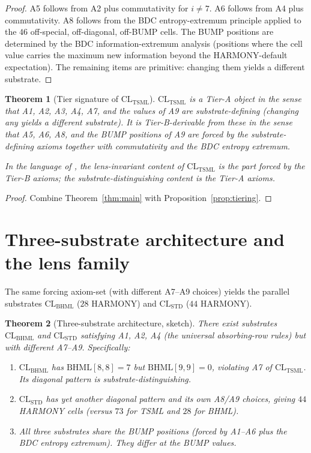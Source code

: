\documentclass[11pt,reqno]{amsart}
\theoremstyle{plain}
\newtheorem{theorem}{Theorem}[section]
\theoremstyle{definition}
\theoremstyle{remark}
\newcommand{\TSML}{\mathrm{TSML}}
\newcommand{\BHML}{\mathrm{BHML}}
\begin{document}
\begin{proof}
A5 follows from A2 plus commutativity for $i \neq 7$. A6 follows from
A4 plus commutativity. A8 follows from the BDC entropy-extremum
principle applied to the $46$ off-special, off-diagonal, off-BUMP cells.
The BUMP positions are determined by the BDC information-extremum
analysis (positions where the cell value carries the maximum new
information beyond the HARMONY-default expectation). The remaining
items are primitive: changing them yields a different substrate.
\end{proof}

\begin{theorem}[Tier signature of $\mathrm{CL}_\TSML$]\label{thm:tier-sig}
$\mathrm{CL}_\TSML$ is a Tier-A object in the sense that A1, A2, A3,
A4, A7, and the values of A9 are substrate-defining (changing any
yields a different substrate). It is Tier-B-derivable from these in
the sense that A5, A6, A8, and the BUMP positions of A9 are forced by
the substrate-defining axioms together with commutativity and the
BDC entropy extremum.

In the language of \cite{SandersLensInvariance}, the lens-invariant
content of $\mathrm{CL}_\TSML$ is the part forced by the Tier-B
axioms; the substrate-distinguishing content is the Tier-A axioms.
\end{theorem}

\begin{proof}
Combine Theorem~\ref{thm:main} with Proposition~\ref{prop:tiering}.
\end{proof}

\section{Three-substrate architecture and the lens family}
\label{sec:threetable}

The same forcing axiom-set (with different A7--A9 choices) yields the
parallel substrates $\mathrm{CL}_\BHML$ ($28$ HARMONY) and
$\mathrm{CL}_\mathrm{STD}$ ($44$ HARMONY).

\begin{theorem}[Three-substrate architecture, sketch]\label{thm:threesub}
There exist substrates $\mathrm{CL}_\BHML$ and $\mathrm{CL}_\mathrm{STD}$
satisfying A1, A2, A4 (the universal absorbing-row rules) but with
different A7--A9. Specifically:
\begin{enumerate}
\item $\mathrm{CL}_\BHML$ has $\BHML[8,8] = 7$ but $\BHML[9,9] = 0$,
violating A7 of $\mathrm{CL}_\TSML$. Its diagonal pattern is
substrate-distinguishing.
\item $\mathrm{CL}_\mathrm{STD}$ has yet another diagonal pattern and
its own A8/A9 choices, giving $44$ HARMONY cells (versus $73$ for
TSML and $28$ for BHML).
\item All three substrates share the BUMP \emph{positions} (forced by
A1--A6 plus the BDC entropy extremum). They differ at the BUMP
\emph{values}.
\end{enumerate}
\end{theorem}
\end{document}
